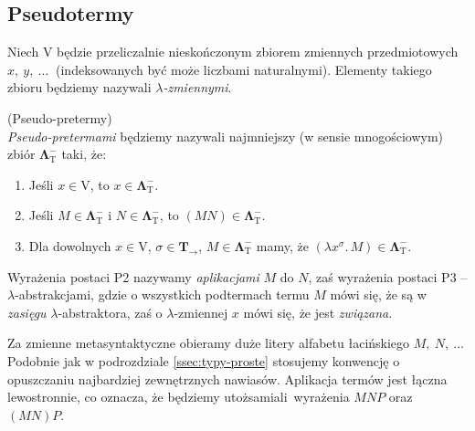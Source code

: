 \subsection{Pseudotermy}
  Niech \(\mathrm{V}\) będzie przeliczalnie nieskończonym zbiorem zmiennych przedmiotowych \(x,\ y,\ \dots\ \) (indeksowanych być może liczbami naturalnymi). Elementy takiego zbioru będziemy nazywali \emph{\(\lambda\)-zmiennymi}.
\begin{definicja}(Pseudo-pretermy)\\
  \emph{Pseudo-pretermami} będziemy nazywali najmniejszy (w sensie mnogościowym) zbiór \(\mathbf{\Lambda}^{-}_{\mathrm{T}}\) taki, że:

\begin{enumerate}[label=P\arabic*.]
    \item Jeśli \(x\in \mathrm{V}\), to \(x\in\mathbf{\Lambda}^{-}_{\mathrm{T}}\).
    \item Jeśli \(M\in\mathbf{\Lambda}^{-}_{\mathrm{T}}\) i \(N\in\mathbf{\Lambda}^{-}_{\mathrm{T}}\), to \((MN)\in\mathbf{\Lambda}^{-}_{\mathrm{T}}\).
    \item Dla dowolnych \(x\in \mathrm{V}\), \(\sigma\in\mathbf{T}_\to\), \(M\in\mathbf{\Lambda}^{-}_{\mathrm{T}}\) mamy, że \((\lambda x^{\sigma}.\,M)\in \mathbf{\Lambda}^{-}_{\mathrm{T}}\).
  \end{enumerate}
\end{definicja}
  Wyrażenia postaci P2 nazywamy \emph{aplikacjami} \(M\) do \(N\), zaś wyrażenia postaci P3 -- \(\lambda\)-abstrakcjami, gdzie o wszystkich podtermach termu \(M\) mówi się, że są w \emph{zasięgu} \(\lambda\)-abstraktora, zaś o \(\lambda\)-zmiennej \(x\) mówi się, że jest \emph{związana}.

  Za zmienne metasyntaktyczne obieramy duże litery alfabetu łacińskiego \(M,\ N,\ \dots\ \) Podobnie jak w podrozdziale \ref{ssec:typy-proste} stosujemy konwencję o opuszczaniu najbardziej zewnętrznych nawiasów. Aplikacja termów jest łączna lewostronnie, co oznacza, że będziemy utożsamiali wyrażenia \(MNP\) oraz \((MN)P\).

